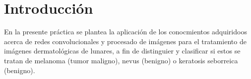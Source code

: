 \section{Introducción}

En la presente práctica se plantea la aplicación de los conocmientos adquiridoos acerca de redes convolucionales y procesado de imágenes para el tratamiento de imágenes dermatológicas de lunares, a fin de distinguier y clasificar si estos se tratan de melanoma (tumor maligno), nevus (benigno) o keratosis seborreica (benigno).
